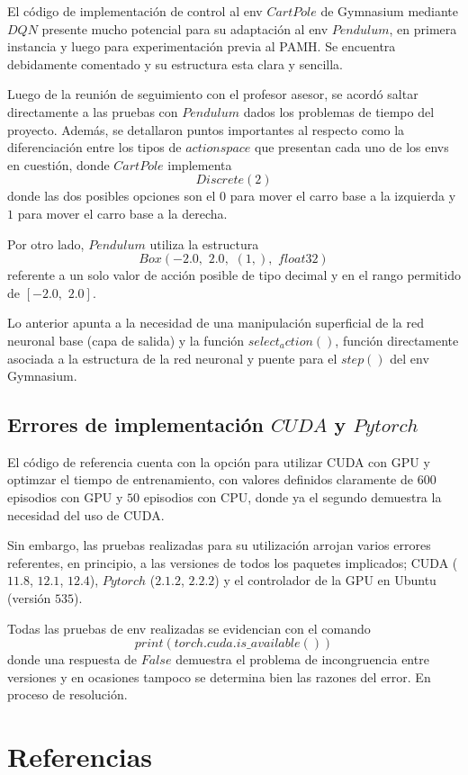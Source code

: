 \documentclass[12pt]{article}
\begin{document}
El código de implementación de control al env $CartPole$ de Gymnasium mediante $DQN$ presente mucho potencial para su adaptación al env $Pendulum$, en primera instancia y luego para experimentación previa al PAMH. Se encuentra debidamente comentado y su estructura esta clara y sencilla.

Luego de la reunión de seguimiento con el profesor asesor, se acordó saltar directamente a las pruebas con $Pendulum$ dados los problemas de tiempo del proyecto. Además, se detallaron puntos importantes al respecto como la diferenciación entre los tipos de $action space$ que presentan cada uno de los envs en cuestión, donde $CartPole$ implementa 
\[Discrete(2)\]
donde las dos posibles opciones son el $0$ para mover el carro base a la izquierda y $1$ para mover el carro base a la derecha.

Por otro lado, $Pendulum$ utiliza la estructura
\[Box(-2.0,\,\, 2.0,\,\, (1,),\,\, float32)\]
referente a un solo valor de acción posible de tipo decimal y en el rango permitido de $[-2.0,\,\, 2.0]$.

Lo anterior apunta a la necesidad de una manipulación superficial de la red neuronal base (capa de salida) y la función $select_action()$, función directamente asociada a la estructura de la red neuronal y puente para el $step()$ del env Gymnasium.


\subsection*{Errores de implementación $CUDA$ y $Pytorch$}

El código de referencia \cite{DQNCart} cuenta con la opción para utilizar CUDA con GPU y optimzar el tiempo de entrenamiento, con valores definidos claramente de $600$ episodios con GPU y $50$ episodios con CPU, donde ya el segundo demuestra la necesidad del uso de CUDA.

Sin embargo, las pruebas realizadas para su utilización arrojan varios errores referentes, en principio, a las versiones de todos los paquetes implicados; CUDA ($11.8$, $12.1$, $12.4$), $Pytorch$ ($2.1.2$, $2.2.2$) y el controlador de la GPU en Ubuntu (versión $535$). 

Todas las pruebas de env realizadas se evidencian con el comando
\[print(torch.cuda.is\_ available())\]
donde una respuesta de $False$ demuestra el problema de incongruencia entre versiones y en ocasiones tampoco se determina bien las razones del error. En proceso de resolución.


\newpage

\section*{Referencias}
\renewcommand\refname{}


\end{document}

